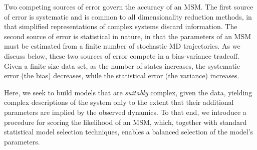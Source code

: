 \documentclass[journal=jpcbfk, layout=traditional, manuscript=article]{achemso}
\begin{document}

Two competing sources of error govern the accuracy of an MSM. The first source of error is systematic and is common to all dimensionality reduction methods, in that simplified representations of complex systems discard information. The second source of error is statistical in nature, in that the parameters of an MSM must be estimated from a finite number of stochastic MD trajectories. As we discuss below, these two sources of error compete in a bias-variance tradeoff\cite{bias_variance_paper}. Given a finite size data set, as the number of states increases, the systematic error (the bias) decreases, while the statistical error (the variance) increases.

Here, we seek to build models that are \emph{suitably} complex, given the data, yielding complex descriptions of the system only to the extent that their additional parameters are implied by the observed dynamics. To that end, we introduce a procedure for scoring the likelihood of an MSM, which, together with standard statistical model selection techniques, enables a balanced selection of the model's parameters. 
\end{document}
